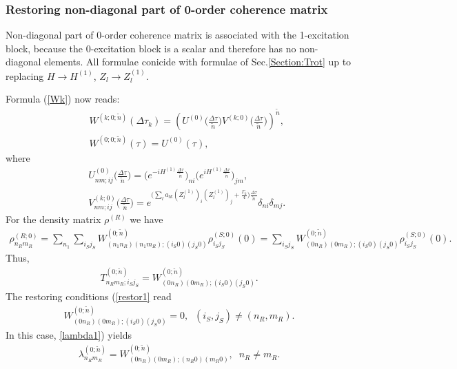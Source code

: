 \documentclass[pra,preprint,showpacs]{revtex4-1}
\begin{document}
{\subsubsection{Restoring non-diagonal part of 0-order coherence matrix}

Non-diagonal part of 0-order coherence matrix is associated with the 1-excitation block, because the 0-excitation block is a scalar and therefore has no non-diagonal elements.
All formulae conicide with formulae of Sec.\ref{Section:Trot} up to replacing $H\to H^{(1)}$, $Z_l\to Z^{(1)}_l$.

Formula (\ref{Wk}) now reads:
\begin{eqnarray}\label{Wk0}
&&
W^{(k;0;\tilde n)}(\Delta\tau_k) =
\left(U^{(0)}\Big(\frac{\Delta \tau}{\tilde n}\Big) V^{(k;0)}\Big(\frac{\Delta \tau}{\tilde n}\Big)\right)^{\tilde n} ,\\\nonumber
&&
W^{(0;0;\tilde n)}(\tau) =U^{(0)}(\tau),
\end{eqnarray}
where
\begin{eqnarray}\label{UV0}
&&
U^{(0)}_{nm;ij}\Big(\frac{\Delta \tau}{\tilde n}\Big) = \Big(e^{ -i H^{(1)}\frac{\Delta \tau}{\tilde n}} \Big)_{ni}\Big(e^{ i H^{(1)}\frac{\Delta \tau}{\tilde n}} \Big)_{jm}  ,\\\nonumber
&&
V^{(k;0)}_{nm;ij}\Big(\frac{\Delta \tau}{\tilde n}\Big) = e^{ \Big( \sum_l a_{lk} (Z^{(1)}_l )_i  (Z^{(1)}_l)_{j}  +\frac{\Gamma_k}{4}\Big)    \frac{\Delta \tau}{\tilde n}} \delta_{ni}\delta_{mj}.
\end{eqnarray}
For the density matrix $\rho^{(R)}$ we have
\begin{eqnarray}
\rho^{(R;0)}_{n_Rm_R} =\sum_{n_1} \sum_{i_Sj_S}W^{(0;\tilde n)}_{(n_1 n_R)(n_1m_R);(i_S0)(j_S0)} \rho^{(S;0)}_{i_Sj_S}(0) =\sum_{i_Sj_S}W^{(0;\tilde n)}_{(0 n_R)(0m_R);(i_S0)(j_S0)}  \rho^{(S;0)}_{i_Sj_S}(0) .
\end{eqnarray}
Thus,
\begin{eqnarray}
T^{(0;\tilde n)}_{n_Rm_R;i_Sj_S} = W^{(0;\tilde n)}_{(0 n_R)(0m_R);(i_S0)(j_S0)} .
\end{eqnarray}
The restoring conditions (\ref{restor1} read
\begin{eqnarray}\label{restoring}
W^{(0;\tilde n)}_{(0 n_R)(0m_R);(i_S0)(j_S0)}=0, \;\;(i_S,j_S)\neq (n_R,m_R) .
\end{eqnarray}
In this case, \ref{lambda1}) yields
\begin{eqnarray}\label{lambda}
\lambda^{(0;\tilde n)}_{n_Rm_R} =W^{(0;\tilde n)}_{(0 n_R)(0m_R);(n_R0)(m_R0)},\;\; n_R\neq m_R.
\end{eqnarray}

}
\end{document}
